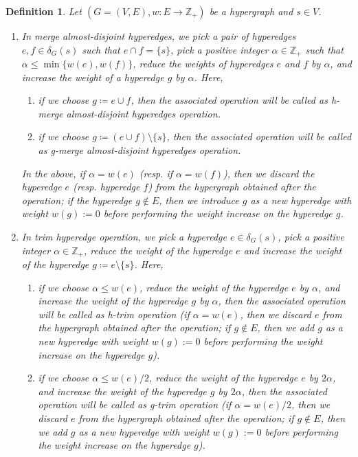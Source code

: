 \documentclass{article}
\newtheorem{definition}{Definition}[section]
\providecommand{\Z}{\mathbb{Z}}
\begin{document}
\begin{definition}\label{defn:splitting-off}
    Let $(G=(V, E), w: E\rightarrow \Z_+)$ be a hypergraph and $s\in V$. 
    \begin{enumerate}
            
        \item 
        In \emph{merge almost-disjoint hyperedges}, we pick a pair of hyperedges $e, f\in \delta_G(s)$ such that $e\cap f=\{s\}$, pick a positive integer $\alpha \in \Z_+$ such that $\alpha\le \min\{w(e), w(f)\}$, reduce the weights of hyperedges $e$ and $f$ by $\alpha$, and increase the weight of a hyperedge $g$ by $\alpha$. Here, 
        \begin{enumerate}
            \item if we choose $g\coloneqq e \cup f$, then the associated operation will be called as \emph{h-merge almost-disjoint hyperedges operation}.
            \item if we choose $g\coloneqq (e\cup f)\setminus \{s\}$, then the associated operation will be called as \emph{g-merge almost-disjoint hyperedges operation}.
        \end{enumerate}
        In the above, if $\alpha=w(e)$ (resp. if $\alpha = w(f)$), then we discard the hyperedge $e$ (resp. hyperedge $f$) from the hypergraph obtained after the operation; if the hyperedge $g\not\in E$, then we introduce $g$ as a new hyperedge with weight $w(g) := 0$ before performing the weight increase on the hyperedge $g$.
    
        \item 
        In \emph{trim hyperedge operation}, we pick a hyperedge $e\in \delta_G(s)$, pick a positive integer $\alpha \in \Z_+$,
        reduce the weight of the hyperedge $e$ and 
        increase the weight of the hyperedge $g\coloneqq e\setminus \{s\}$. Here, 
        \begin{enumerate}
            \item if we choose $\alpha \le w(e)$, reduce the weight of the hyperedge $e$ by $\alpha$,  and increase the weight of the hyperedge $g$ by $\alpha$, then the associated operation will be called as \emph{h-trim operation} (if $\alpha=w(e)$, then we discard $e$ from the hypergraph obtained after the operation; if $g\not\in E$, then we add $g$ as a new hyperedge with weight $w(g) := 0$ before performing the weight increase on the hyperedge $g$). 
            
            \item if we choose $\alpha \le w(e)/2$, reduce the weight of the hyperedge $e$ by $2\alpha$, and increase the weight of the hyperedge $g$ by $2\alpha$, then the associated operation will be called as \emph{g-trim operation} (if $\alpha=w(e)/2$, then we discard $e$ from the hypergraph obtained after the operation; if $g\not\in E$, then we add $g$ as a new hyperedge with weight $w(g) := 0$ before performing the weight increase on the hyperedge $g$).  
        \end{enumerate}


\end{enumerate}
\end{definition}
\end{document}
